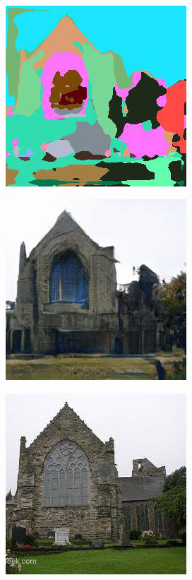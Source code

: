 \documentclass{article}
\begin{document}
\begin{figure}[h!]
\begin{subfigure}[h!]{0.3\textwidth}
    \end{subfigure}\\
     \begin{subfigure}[h!]{0.3\textwidth}
        \includegraphics[scale=0.3]{110013_real_A.png}
    \end{subfigure}
     \begin{subfigure}[h!]{0.3\textwidth}
        \includegraphics[scale=0.3]{110013_fake_B.png}
    \end{subfigure}
     \begin{subfigure}[h!]{0.3\textwidth}
        \includegraphics[scale=0.3]{110013_real_B.png}
    \end{subfigure}
\end{figure}
\end{document}
